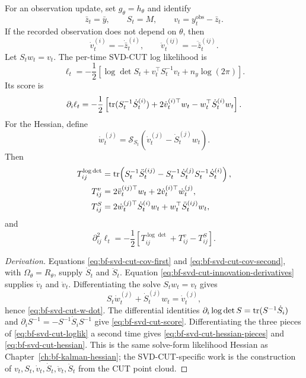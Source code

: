 For an observation update, set $g_\theta=h_\theta$ and identify
\[
  \bar z_t=\bar y,\qquad
  S_t=M,\qquad
  v_t=y_t^{\mathrm{obs}}-\bar z_t .
\]
If the recorded observation does not depend on $\theta$, then
\begin{equation}
\label{eq:bf-svd-cut-innovation-derivatives}
  \dot v_t^{(i)}=-\dot{\bar z}_t^{(i)},\qquad
  \ddot v_t^{(ij)}=-\ddot{\bar z}_t^{(ij)} .
\end{equation}
Let $S_tw_t=v_t$.  The per-time SVD-CUT log likelihood is
\begin{equation}
\label{eq:bf-svd-cut-loglik}
  \ell_t
  =
  -\frac{1}{2}
  \left[
    \log\det S_t+v_t^\top S_t^{-1}v_t+n_y\log(2\pi)
  \right].
\end{equation}
Its score is
\begin{equation}
\label{eq:bf-svd-cut-score}
  \partial_i\ell_t
  =
  -\frac{1}{2}
  \left[
    \operatorname{tr}(S_t^{-1}\dot S_t^{(i)})
    +2\dot v_t^{(i)\top}w_t
    -w_t^\top\dot S_t^{(i)}w_t
  \right].
\end{equation}
For the Hessian, define
\begin{equation}
\label{eq:bf-svd-cut-w-dot}
  \dot w_t^{(j)}
  =
  \mathcal{S}_{S_t}
  \left(\dot v_t^{(j)}-\dot S_t^{(j)}w_t\right).
\end{equation}
Then
\begin{align}
\label{eq:bf-svd-cut-hessian-pieces}
  T_{ij}^{\log\det}
  &=
  \operatorname{tr}\!\left(
    S_t^{-1}\ddot S_t^{(ij)}
    -S_t^{-1}\dot S_t^{(j)}S_t^{-1}\dot S_t^{(i)}
  \right),\\
  T_{ij}^{v}
  &=
  2\ddot v_t^{(ij)\top}w_t
  +2\dot v_t^{(i)\top}\dot w_t^{(j)},\\
  T_{ij}^{S}
  &=
  2\dot w_t^{(j)\top}\dot S_t^{(i)}w_t
  +w_t^\top\ddot S_t^{(ij)}w_t ,
\end{align}
and
\begin{equation}
\label{eq:bf-svd-cut-hessian}
  \partial_{ij}^2\ell_t
  =
  -\frac{1}{2}
  \left[
    T_{ij}^{\log\det}+T_{ij}^{v}-T_{ij}^{S}
  \right].
\end{equation}

\begin{proof}[Derivation]
Equations \eqref{eq:bf-svd-cut-cov-first} and
\eqref{eq:bf-svd-cut-cov-second}, with $\Omega_\theta=R_\theta$, supply
$\dot S_t$ and $\ddot S_t$.  Equation
\eqref{eq:bf-svd-cut-innovation-derivatives} supplies $\dot v_t$ and
$\ddot v_t$.  Differentiating the solve $S_tw_t=v_t$ gives
\[
  S_t\dot w_t^{(j)}+\dot S_t^{(j)}w_t=\dot v_t^{(j)},
\]
hence \eqref{eq:bf-svd-cut-w-dot}.  The differential identities
$\partial_i\log\det S=\operatorname{tr}(S^{-1}\dot S_i)$ and
$\partial_i S^{-1}=-S^{-1}\dot S_iS^{-1}$ give
\eqref{eq:bf-svd-cut-score}.  Differentiating the three pieces of
\eqref{eq:bf-svd-cut-loglik} a second time gives
\eqref{eq:bf-svd-cut-hessian-pieces} and
\eqref{eq:bf-svd-cut-hessian}.  This is the same solve-form likelihood
Hessian as Chapter~\ref{ch:bf-kalman-hessian}; the SVD-CUT-specific work is the
construction of $v_t,S_t,\dot v_t,\dot S_t,\ddot v_t,\ddot S_t$ from the CUT
point cloud.
\end{proof}


